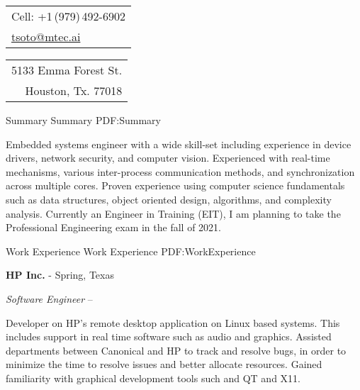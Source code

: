 \documentclass[letterpaper,MMMyyyy,nonstopmode]{simpleresumecv}
\newcommand{\CVAuthor}{Timothy Soto}
\begin{document}

\Title{\CVAuthor}

\noindent
\begin{tabular}[t]{@{}l}
    Cell: +1\,(979)\,492-6902 \\
    \href{mailto:tsoto@mtec.ai}
    {tsoto@mtec.ai}
\end{tabular}
\hfill%
\begin{tabular}[t]{r@{}}
    5133 Emma Forest St. \\ Houston, Tx. 77018
\end{tabular}

\begin{Body}


    \Section
    {Summary}
    {Summary}
    {PDF:Summary}

    Embedded systems engineer with a wide skill-set including experience in device drivers, network security, and computer vision. Experienced with real-time mechanisms, various inter-process communication methods, and synchronization across multiple cores. Proven experience using computer science fundamentals such as data structures, object oriented design, algorithms, and complexity analysis. Currently an Engineer in Training (EIT), I am planning to take the Professional Engineering exam in the fall of 2021.


    \Section
    {Work Experience}
    {Work Experience}
    {PDF:WorkExperience}

    {\textbf{HP Inc.}}
    - Spring, Texas

        {\textit{Software Engineer}}
    \hfill
     --

    \begin{Detail}
        \BulletItem
        Developer on HP's remote desktop application on Linux based systems. This includes support in real time software such as audio and graphics.
        \vspace{1mm} %
        \BulletItem
        Assisted departments between Canonical and HP to track and resolve bugs, in order to minimize the time to resolve issues and better allocate resources.
        \vspace{1mm} %
        \BulletItem
        Gained familiarity with graphical development tools such and QT and X11.
        \vspace{1mm} %
    \end{Detail}
    \vspace{3mm} %


\end{Body}
\end{document}
